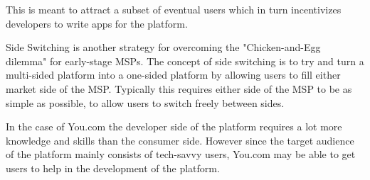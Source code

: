 \documentclass[5p,twocolumn,final]{elsarticle}
\begin{document}
%
This is meant to attract a subset of eventual users which in turn incentivizes developers to write apps for the platform.\par
Side Switching is another strategy for overcoming the "Chicken-and-Egg dilemma" for early-stage MSPs. The concept of side switching is to try and turn a multi-sided platform into a one-sided platform by allowing users to fill either market side of the MSP. Typically this requires either side of the MSP to be as simple as possible, to allow users to switch freely between sides.\cite[Section 2.6]{linde2009pricing}\par
%
In the case of You.com the developer side of the platform requires a lot more knowledge and skills than the consumer side. However since the target audience of the platform mainly consists of tech-savvy users, You.com may be able to get users to help in the development of the platform.

\end{document}
